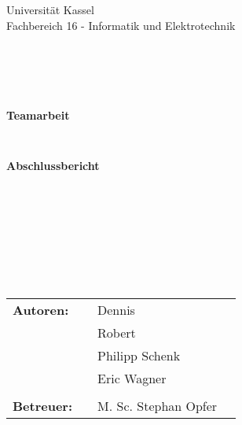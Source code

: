 \documentclass[a4paper,12pt,headsepline,toc=flat]{scrartcl}
\begin{document}
	
	\begin{verbatim}
	
	
	\end{verbatim}
	
	\begin{center}
		\Large{Universität Kassel}\\
		\Large{Fachbereich 16 - Informatik und Elektrotechnik}\\
	\end{center}
	
	
	\begin{verbatim}
	
	
	
	
	\end{verbatim}
	\begin{center}
		\doublespacing
		\textbf{\LARGE{Teamarbeit}}\\
		\singlespacing
		\begin{verbatim}
		
		\end{verbatim}
		\textbf{Abschlussbericht}
	\end{center}
	\begin{verbatim}
	
	\end{verbatim}
	\begin{center}
		
	\end{center}
	\begin{verbatim}
	
	\end{verbatim}
	\begin{center}
		
	\end{center}
	\begin{verbatim}
	
	
	
	
	\end{verbatim}
	\begin{flushleft}
		\begin{tabular}{llll}
			\textbf{Autoren:} & & Dennis & \\
			& & Robert & \\
			& & Philipp Schenk & \\
			& & Eric Wagner & \\ \\
			\textbf{Betreuer:} & & M. Sc. Stephan Opfer &\\
		\end{tabular}
	\end{flushleft}
	\newpage
	
\end{document}
